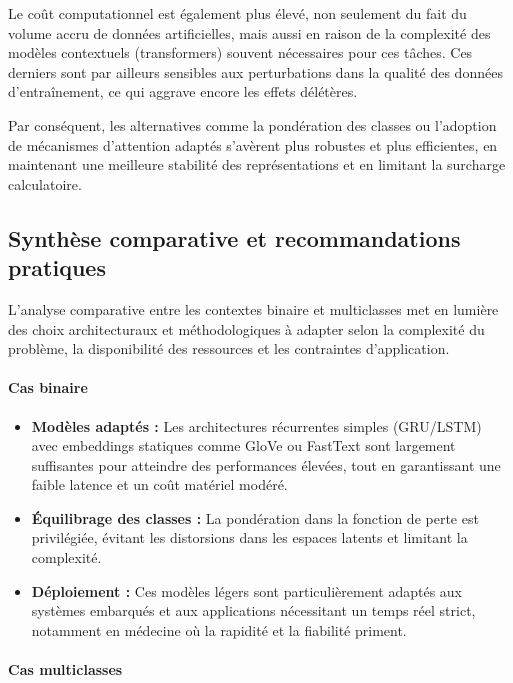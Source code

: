 \documentclass[12pt]{report}
\begin{document}
Le coût computationnel est également plus élevé, non seulement du fait du volume accru de données artificielles, mais aussi en raison de la complexité des modèles contextuels (transformers) souvent nécessaires pour ces tâches. Ces derniers sont par ailleurs sensibles aux perturbations dans la qualité des données d’entraînement, ce qui aggrave encore les effets délétères.

Par conséquent, les alternatives comme la pondération des classes ou l’adoption de mécanismes d’attention adaptés s’avèrent plus robustes et plus efficientes, en maintenant une meilleure stabilité des représentations et en limitant la surcharge calculatoire.

\subsection{Synthèse comparative et recommandations pratiques}

L’analyse comparative entre les contextes binaire et multiclasses met en lumière des choix architecturaux et méthodologiques à adapter selon la complexité du problème, la disponibilité des ressources et les contraintes d’application.

\paragraph{Cas binaire}

\begin{itemize}
    \item \textbf{Modèles adaptés :} Les architectures récurrentes simples (GRU/LSTM) avec embeddings statiques comme GloVe ou FastText sont largement suffisantes pour atteindre des performances élevées, tout en garantissant une faible latence et un coût matériel modéré.
    \item \textbf{Équilibrage des classes :} La pondération dans la fonction de perte est privilégiée, évitant les distorsions dans les espaces latents et limitant la complexité.
    \item \textbf{Déploiement :} Ces modèles légers sont particulièrement adaptés aux systèmes embarqués et aux applications nécessitant un temps réel strict, notamment en médecine où la rapidité et la fiabilité priment.
\end{itemize}

\paragraph{Cas multiclasses}
\end{document}

